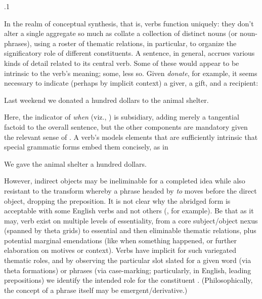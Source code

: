 \documentclass[11pt, twocolumn]{article}
\begin{document}
\p.1{%
\:\+In the realm of conceptual synthesis, that is, verbs
function uniquely: they don't alter a single aggregate so
much as collate a collection of distinct nouns
(or noun-phrases), using a roster of thematic relations,
in particular, to organize
the significatory role of different 
constituents. \> A sentence, in general, accrues various kinds of detail
related to its central verb. \> Some of these
would appear to be intrinsic to the verb's meaning; some, less
so. \> Given \textit{donate}, for example, it seems necessary
to indicate (perhaps by implicit context) a giver, a gift,
and a recipient:\<

\begin{exsGroup}

\exsItem{}   Last weekend we donated a hundred dollars to the animal shelter.

\end{exsGroup}

\nip{}%
\+Here, the indicator of \textit{when} (viz., ) is subsidiary, adding merely a tangential
factoid to the overall sentence, but the other components are
mandatory given the relevant sense of . \> A verb's
 models elements that are sufficiently
intrinsic that special grammatic forms embed them concisely,
as in\<

\begin{exsGroup}

\exsItem{}   We gave the animal shelter a hundred dollars.

\end{exsGroup}

\nip{}%
\+However, indirect objects may be ineliminable for a completed idea while
also resistant to the transform whereby a phrase headed
by \textit{to} moves before the direct object, dropping the 
preposition. \> It is not clear why the abridged  form is acceptable
with some English verbs and not others 
(, for example). \> Be that as it may,
verb  exist on multiple levels of essentiality,
from a core subject/object nexus (spanned by theta grids) to
essential and then eliminable thematic relations, plus potential marginal
emendations (like when something happened, or further elaboration
on motives or context). \> Verbs have implicit
 for such variegated thematic roles, and by observing
the particular slot slated for a given word (via theta formations)
or phrases (via case-marking; particularly, in English, leading
prepositions) \pgl{}we identify the intended role for the constituent . \> (Philosophically,
the concept of a phrase itself may be emergent/derivative.)\<\;
} %
\end{document}
